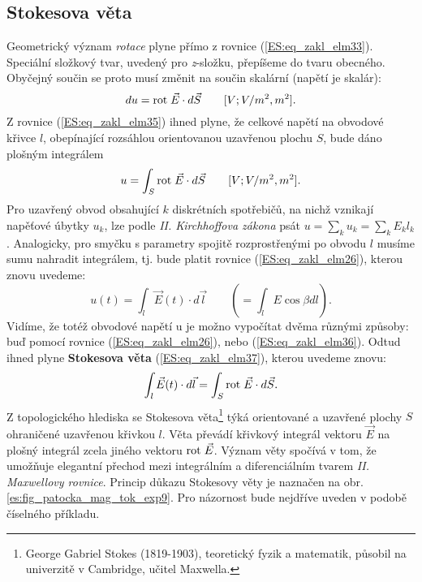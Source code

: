       \subsection{Stokesova věta}\label{ES:sec06}
        Geometrický význam \emph{rotace} plyne přímo z rovnice (\ref{ES:eq_zakl_elm33}). Speciální 
        složkový tvar, uvedený pro \emph{z}-složku, přepíšeme do tvaru obecného. Obyčejný součin se 
        proto musí změnit na součin skalární (napětí je skalár):
        \begin{equation}\label{ES:eq_zakl_elm35}
          du = \mathrm{rot}\;\vec{E}\cdot d\vec{S} \qquad[V; V/m^2, m^2].
        \end{equation}
        Z rovnice (\ref{ES:eq_zakl_elm35}) ihned plyne, že celkové napětí na obvodové křivce \(l\), 
        obepínající rozsáhlou orientovanou uzavřenou plochu \(S\), bude dáno plošným integrálem
        \begin{equation}\label{ES:eq_zakl_elm36}
          u = \int_S\mathrm{rot}\;\vec{E} \cdot d\vec{S} \qquad[V; V/m^2, m^2].
        \end{equation}
        Pro uzavřený obvod obsahující \(k\) diskrétních spotřebičů, na nichž vznikají napěťové 
        úbytky \(u_k\), lze podle \emph{II. Kirchhoffova zákona} psát \(u=\sum_ku_k 
        =\sum_kE_kl_k\). Analogicky, pro smyčku s parametry spojitě rozprostřenými po obvodu \(l\) 
        musíme sumu nahradit integrálem, tj. bude platit rovnice  (\ref{ES:eq_zakl_elm26}), kterou 
        znovu uvedeme:
        \begin{equation*}
          u(t) = \int_{l}\vec{E}(t)\cdot d\vec{l} \qquad (=\int_lE\cos\beta dl).
        \end{equation*}
        Vidíme, že totéž obvodové napětí u je možno vypočítat dvěma různými způsoby: buď pomocí 
        rovnice  (\ref{ES:eq_zakl_elm26}), nebo (\ref{ES:eq_zakl_elm36}). Odtud ihned plyne 
        \textbf{Stokesova věta} (\ref{ES:eq_zakl_elm37}), kterou uvedeme znovu:
        \begin{equation}\label{ES:eq_zakl_elm37}
          \int_{l}\vec{E}(t)\cdot d\vec{l} = \int_S\mathrm{rot}\;\vec{E} \cdot d\vec{S}.
        \end{equation}
        Z topologického hlediska se Stokesova věta\footnote{George Gabriel Stokes (1819-1903), 
        teoretický fyzik a matematik, působil na univerzitě v Cambridge, učitel Maxwella.} týká 
        orientované a uzavřené plochy \(S\) ohraničené uzavřenou křivkou \(l\). Věta převádí 
        křivkový integrál vektoru \(\vec{E}\) na plošný integrál zcela jiného vektoru \(\mathrm{rot}\;\vec{E}\). 
        Význam věty spočívá v tom, že umožňuje elegantní přechod mezi integrálním a diferenciálním 
        tvarem \emph{II. Maxwellovy rovnice}. Princip důkazu Stokesovy věty je naznačen na obr. 
        \ref{es:fig_patocka_mag_tok_exp9}. Pro názornost bude nejdříve uveden v podobě číselného 
        příkladu.
        
